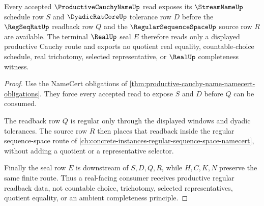 \begin{theorem}
\label{thm:productive-cauchy-name-regular-readback}
Every accepted $\ProductiveCauchyNameUp$ read exposes its $\StreamNameUp$ schedule row $S$ and $\DyadicRatCoreUp$ tolerance row $D$ before the $\RegSeqRatUp$ readback row $Q$ and the $\RegularSequenceSpaceUp$ source row $R$ are available. The terminal $\RealUp$ seal $E$ therefore reads only a displayed productive Cauchy route and exports no quotient real equality, countable-choice schedule, real trichotomy, selected representative, or $\RealUp$ completeness witness.
\end{theorem}
\begin{proof}
Use the NameCert obligations of \autoref{thm:productive-cauchy-name-namecert-obligations}. They force every accepted read to expose $S$ and $D$ before $Q$ can be consumed.

The readback row $Q$ is regular only through the displayed windows and dyadic tolerances. The source row $R$ then places that readback inside the regular sequence-space route of \autoref{ch:concrete-instances-regular-sequence-space-namecert}, without adding a quotient or a representative selector.

Finally the seal row $E$ is downstream of $S,D,Q,R$, while $H,C,K,N$ preserve the same finite route. Thus a real-facing consumer receives productive regular readback data, not countable choice, trichotomy, selected representatives, quotient equality, or an ambient completeness principle.
\end{proof}




